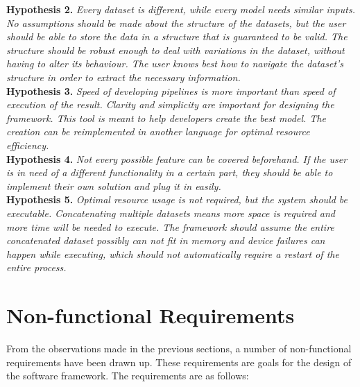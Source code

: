 \textbf{Hypothesis 2.} \textit{Every dataset is different, while every model needs similar inputs. No assumptions should be made about the structure of the datasets, but the user should be able to store the data in a structure that is guaranteed to be valid. The structure should be robust enough to deal with variations in the dataset, without having to alter its behaviour. The user knows best how to navigate the dataset's structure in order to extract the necessary information.}\\

\textbf{Hypothesis 3.} \textit{Speed of developing pipelines is more important than speed of execution of the result. Clarity and simplicity are important for designing the framework. This tool is meant to help developers create the best model. The creation can be reimplemented in another language for optimal resource efficiency.}\\

\textbf{Hypothesis 4.} \textit{Not every possible feature can be covered beforehand. If the user is in need of a different functionality in a certain part, they should be able to implement their own solution and plug it in easily.}\\

\textbf{Hypothesis 5.} \textit{Optimal resource usage is not required, but the system should be executable. Concatenating multiple datasets means more space is required and more time will be needed to execute. The framework should assume the entire concatenated dataset possibly can not fit in memory and device failures can happen while executing, which should not automatically require a restart of the entire process.}\\


\section{Non-functional Requirements} \label{problem:nonfunc}

From the observations made in the previous sections, a number of non-functional requirements have been drawn up. These requirements are goals for the design of the software framework. The requirements are as follows:

